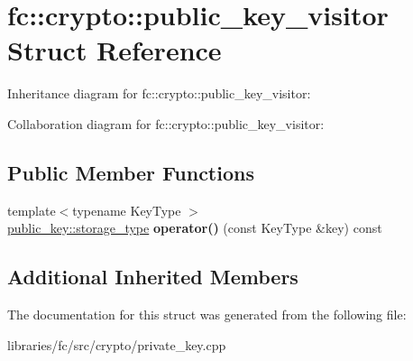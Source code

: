 \hypertarget{structfc_1_1crypto_1_1public__key__visitor}{}\section{fc\+:\+:crypto\+:\+:public\+\_\+key\+\_\+visitor Struct Reference}
\label{structfc_1_1crypto_1_1public__key__visitor}


Inheritance diagram for fc\+:\+:crypto\+:\+:public\+\_\+key\+\_\+visitor\+:


Collaboration diagram for fc\+:\+:crypto\+:\+:public\+\_\+key\+\_\+visitor\+:
\subsection*{Public Member Functions}
\begin{DoxyCompactItemize}
\item 
\mbox{\label{structfc_1_1crypto_1_1public__key__visitor_ab5629d79f88248f07a18fad39b06c5ca}} 
{\footnotesize template$<$typename Key\+Type $>$ }\\\mbox{\hyperlink{classfc_1_1static__variant}{public\+\_\+key\+::storage\+\_\+type}} {\bfseries operator()} (const Key\+Type \&key) const
\end{DoxyCompactItemize}
\subsection*{Additional Inherited Members}


The documentation for this struct was generated from the following file\+:\begin{DoxyCompactItemize}
\item 
libraries/fc/src/crypto/private\+\_\+key.\+cpp\end{DoxyCompactItemize}
